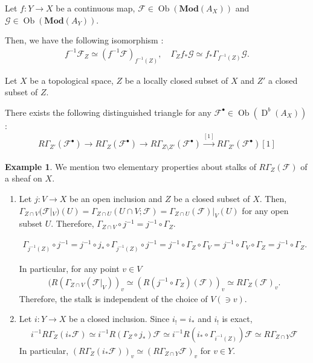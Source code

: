 \documentclass[a4paper,dvipdfmx,reqno,12pt]{amsart}
\theoremstyle{definition}
\newtheorem{example}[theorem]{Example}
\newcommand{\mcal}[1]{\mathcal{#1}}%
\newcommand{\opn}[1]{\operatorname{#1}}
\newcommand{\catn}[1]{\mathbf{#1}}
\newcommand{\xto}[1]{\xrightarrow{#1}}
\numberwithin{equation}{section}
\begin{document}
Let $f\colon Y\to X$ be a continuous map,
$\mathcal{F}\in \opn{Ob}(\catn{Mod}(A_X))$
and $\mathcal{G}\in\opn{Ob}(\catn{Mod}(A_Y))$.

Then, we have the following isomorphism 
\cite[(2.3.19)-(2.3.20)]{MR1299726}:
\begin{align}
f^{-1}\mathcal{F}_Z\simeq 
(f^{-1}\mathcal{F})_{f^{-1}(Z)},\quad 
\Gamma_Zf_*\mathcal{G}\simeq f_*\Gamma_{f^{-1}(Z)}
\mathcal{G}.
\end{align}


Let $X$ be a topological space, $Z$ be a locally 
closed subset of $X$ and $Z'$ a closed subset of $Z$.

There exists the following distinguished triangle 
for any $\mathcal{F}^{\bullet}\in \opn{Ob}(\opn{D}^{b}(A_X))$ 
\cite[(2.6.32)]{MR1299726}:
\begin{align} \label{equation-exact-local}
  R\Gamma_{Z'}(\mcal{F}^{\bullet})\to 
R\Gamma_{Z}(\mcal{F}^{\bullet})\to 
R\Gamma_{Z\setminus Z'}(\mcal{F}^{\bullet})\xto{[1]} 
R\Gamma_{Z'}(\mcal{F}^{\bullet})[1]
\end{align}


\begin{example}

We mention two elementary properties 
about stalks of $R\Gamma_{Z}(\mcal{F})$ of a sheaf on 
$X$.

\begin{enumerate}
\item Let $j:V\to X$ be an open inclusion and $Z$ be a 
closed subset of $X$.
Then, $\Gamma_{Z\cap V}(\mcal{F}|_V)(U)=
\Gamma_{Z\cap U}(U\cap V;\mcal{F})=\Gamma_{Z\cap U}(\mcal{F})|_V(U)$
for any open subset $U$.
Therefore, $\Gamma_{Z\cap V}\circ j^{-1}=j^{-1}\circ \Gamma_{Z}$.

\begin{align}
\Gamma_{j^{-1}(Z)} \circ j^{-1}
=j^{-1}\circ j_*\circ \Gamma_{j^{-1}(Z)} \circ j^{-1}
=j^{-1}\circ\Gamma_{Z}\circ \Gamma_V
=j^{-1}\circ \Gamma_V \circ \Gamma_Z
=j^{-1} \circ \Gamma_Z.
\end{align}

In particular, for any point $v\in V$
\begin{align}
(R(\Gamma_{Z\cap V}(\mcal{F}|_{V}))_v\simeq 
(R(j^{-1}\circ \Gamma_{Z})(\mcal{F}))_v\simeq 
R\Gamma_{Z}(\mcal{F})_v.
\end{align}
Therefore, the stalk is independent of 
the choice of $V (\ni v)$.
\item Let $i: Y\to X$ be a closed inclusion.
Since $i_!=i_*$ and $i_!$ is exact,
\begin{align}
  i^{-1}R\Gamma_{Z}(i_*\mcal{F})\simeq i^{-1}R(\Gamma_{Z}\circ j_*)\mcal{F}
  \simeq i^{-1}R(i_*\circ \Gamma_{i^{-1}(Z)})\mcal{F}
  \simeq R\Gamma_{Z\cap Y}\mcal{F}
\end{align}
In particular, $(R\Gamma_{Z}(i_*\mcal{F}))_v
  \simeq (R\Gamma_{Z\cap Y}\mcal{F})_v$ for $v\in Y$.
\end{enumerate}

\end{example}
\end{document}

